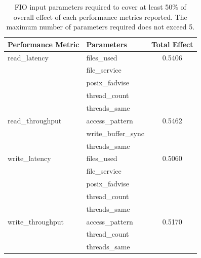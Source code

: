 \begin{table}[!t]
\centering
\begin{tabularx}{0.9\textwidth}{
  l | 
  X 
  c
}
\hline
\bfseries Performance Metric &\bfseries Parameters &\bfseries Total Effect\\
\hline\hline
read\_latency       & files\_used                               &0.5406   \\
                    & file\_service                             &         \\ 
                    & posix\_fadvise                            &         \\ 
                    & thread\_count                             &         \\
                    & threads\_same                             &         \\
\hline
read\_throughput    & access\_pattern                           &0.5462   \\
                    & write\_buffer\_sync                       &         \\
                    & threads\_same                             &         \\
\hline
write\_latency      & files\_used                               &0.5060   \\
                    & file\_service                             &         \\
                    & posix\_fadvise                            &         \\
                    & thread\_count                             &         \\
                    & threads\_same                             &         \\
\hline
write\_throughput   & access\_pattern                           &0.5170   \\  
                    & thread\_count                             &         \\ 
                    & threads\_same                             &         \\
\hline
\end{tabularx}
\captionsetup{format=myformat}
\caption{FIO input parameters required to cover at least 50\% of overall effect of each performance metrics reported.
The maximum number of parameters required does not exceed 5.}
\label{fio_50_t}
\end{table}

